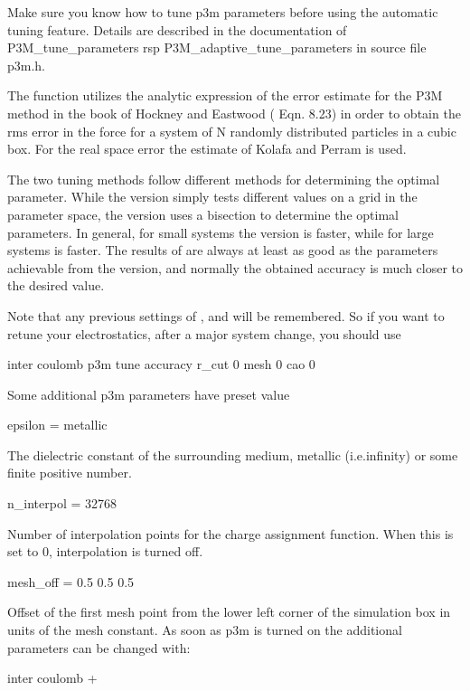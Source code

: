 
Make sure you know how to tune p3m parameters before using the
automatic tuning feature. Details are described in the documentation
of P3M_tune_parameters rsp P3M_adaptive_tune_parameters in source file p3m.h.

The function utilizes the analytic expression of the error estimate for the P3M method in the book of Hockney and Eastwood (\cite{hockney88} Eqn. 8.23) in order to obtain the rms error in the force for a system of N randomly distributed particles in a cubic box. For the real space error the estimate of Kolafa and Perram\cite{kolafa92} is used.

The two tuning methods follow different methods for determining the
optimal parameter. While the  version simply tests
different values on a grid in the parameter space, the
 version uses a bisection to determine the optimal
parameters. In general, for small systems the  version
is faster, while for large systems  is faster. The
results of  are always at least as good as the
parameters achievable from the  version, and normally
the obtained accuracy is much closer to the desired value.

Note that any previous settings of ,  and
 will be remembered. So if you want to retune your
electrostatics, \eg after a major system change, you should use
\begin{code}
inter coulomb  p3m tune accuracy  r_cut 0 mesh 0 cao 0
\end{code}
Some additional p3m parameters have preset value
\begin{tclcode}
 epsilon = metallic
\end{tclcode}
The dielectric constant of the surrounding medium, metallic
(i.e.infinity) or some finite positive number.
\begin{tclcode}
 n_interpol = 32768
\end{tclcode}
Number of interpolation points for the charge assignment function.
When this is set to 0, interpolation is turned off.
\begin{tclcode}
 mesh_off = 0.5 0.5 0.5
\end{tclcode}
Offset of the first mesh point from the lower left corner of the
simulation box in units of the mesh constant. As soon as p3m is turned
on the additional parameters can be changed with:
\begin{code}
inter coulomb  +
\end{code}


